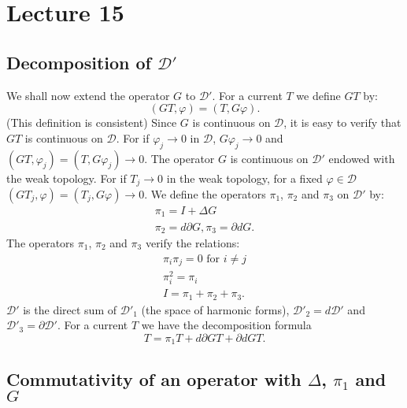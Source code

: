 \chapter{Lecture 15}

\section*{Decomposition of $\mathscr{D}'$}\pageoriginale

We shall now extend the operator $G$ to $\mathscr{D}'$. For a current
$T$ we define $GT$ by:
$$
(GT,\varphi)=(T,G\varphi).
$$
(This definition is consistent) Since $G$ is continuous on
$\mathscr{D}$, it is easy to verify that $GT$ is continuous on
$\mathscr{D}$. For if $\varphi_{j}\to 0$ in $\mathscr{D}$,
$G\varphi_{j}\to 0$ and $(GT,\varphi_{j})=(T,G\varphi_{j})\to 0$. The
operator $G$ is continuous on $\mathscr{D}'$ endowed with the weak
topology. For if $T_{j}\to 0$ in the weak topology, for a fixed
$\varphi\in\mathscr{D}$ $(GT_{j},\varphi)=(T_{j},G\varphi)\to 0$. We
define the operators $\pi_{1}$, $\pi_{2}$ and $\pi_{3}$ on
$\mathscr{D}'$ by:
\begin{gather*}
\pi_{1}=I+\Delta G\\
\pi_{2}=d\partial G,\pi_{3}=\partial dG.
\end{gather*}
The operators $\pi_{1}$, $\pi_{2}$ and $\pi_{3}$ verify the relations:
\begin{gather*}
\pi_{i}\pi_{j}=0\text{ \  for \ } i \neq j\\
\pi^{2}_{i}=\pi_{i}\\
I = \pi_{1}+\pi_{2}+\pi_{3}.
\end{gather*}
$\mathscr{D}'$ is the direct sum of $\mathscr{D}'_{1}$ (the space of
harmonic forms), $\mathscr{D}'_{2}=d\mathscr{D}'$ and
$\mathscr{D}'_{3}=\partial \mathscr{D}'$. For a current $T$ we have
the decomposition formula 
$$
T=\pi_{1}T+d\partial GT+\partial dGT.
$$

\section*{Commutativity of an operator with $\Delta$, $\pi_{1}$ and
  $G$}\pageoriginale

